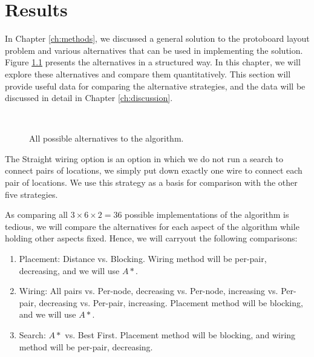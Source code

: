
\chapter{Results}
\label{ch:results}

In Chapter \ref{ch:methods}, we discussed a general solution to the protoboard
layout problem and various alternatives that can be used in implementing the
solution. Figure \ref{fig:alternatives} presents the alternatives in a structured
way. In this chapter, we will explore these alternatives and compare them
quantitatively.
This section will provide useful data for comparing the alternative strategies,
and the data will be discussed in detail in Chapter \ref{ch:discussion}.

\begin{figure}[H]
\centering
{}
\hspace{1cm}
\\
\label{fig:alternatives}
\caption{All possible alternatives to the algorithm.}
\end{figure}

The Straight wiring option is an option in which we do not run a search to
connect pairs of locations, we simply put down exactly one wire to connect each
pair of locations. We use this strategy as a basis for comparison with the other
five strategies.

As comparing all $3 \times 6 \times 2 = 36$ possible implementations of the
algorithm is tedious, we
will compare the alternatives for each aspect of the algorithm while holding
other aspects fixed. Hence, we will carryout the following comparisons:

\begin{enumerate}
\item Placement: Distance vs. Blocking. Wiring method will be per-pair,
decreasing, and we will use $A*$.
\item Wiring: All pairs vs. Per-node, decreasing vs. Per-node, increasing vs.
Per-pair, decreasing vs. Per-pair, increasing. Placement method will be
blocking, and we will use $A*$.
\item Search: $A*$ vs. Best First. Placement method will be blocking, and wiring
method will be per-pair, decreasing.
\end{enumerate}

